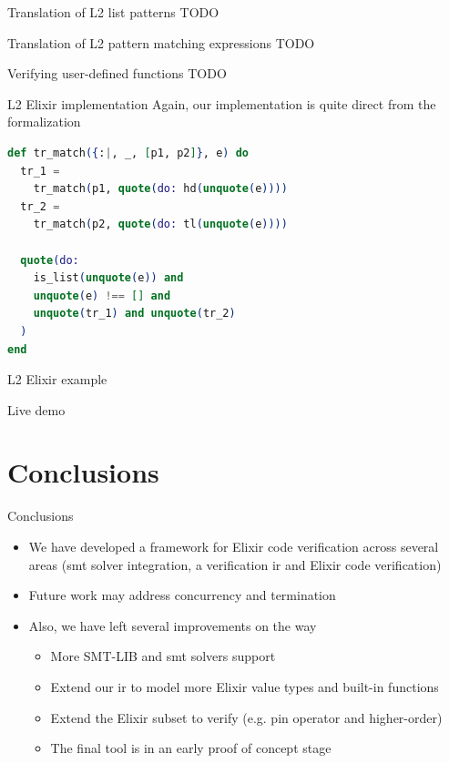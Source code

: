\documentclass{beamer}
\begin{document}
  \begin{frame}{Translation of L2 list patterns}
    TODO
  \end{frame}
  \begin{frame}{Translation of L2 pattern matching expressions}
    TODO
  \end{frame}
  \begin{frame}{Verifying user-defined functions}
    TODO
  \end{frame}
  \begin{frame}[fragile]{L2 Elixir implementation}
    Again, our implementation is quite direct from the formalization
    \small
    \begin{lstlisting}[language=elixir,numbers=none,frame=none]
def tr_match({:|, _, [p1, p2]}, e) do
  tr_1 = 
    tr_match(p1, quote(do: hd(unquote(e))))
  tr_2 = 
    tr_match(p2, quote(do: tl(unquote(e))))

  quote(do:
    is_list(unquote(e)) and 
    unquote(e) !== [] and
    unquote(tr_1) and unquote(tr_2)
  )
end
    \end{lstlisting}
  \end{frame}
  \begin{frame}[plain,c]{L2 Elixir example}
    \begin{center}
      \Huge Live demo
    \end{center}
  \end{frame}
  \section{Conclusions}
  \begin{frame}{Conclusions}
    \begin{itemize}
      \item We have developed a framework for Elixir code verification across several areas (\acrshort*{smt} solver integration, a verification \gls*{ir} and Elixir code verification)
      \item Future work may address concurrency and termination
      \item Also, we have left several improvements on the way
      \begin{itemize}
        \item More SMT-LIB and \acrshort*{smt} solvers support
        \item Extend our \gls*{ir} to model more Elixir value types and built-in functions
        \item Extend the Elixir subset to verify (e.g. pin operator and higher-order)
        \item The final tool is in an early proof of concept stage
      \end{itemize}
    \end{itemize}
  \end{frame}
  \appendix
  \maketitle
\end{document}
